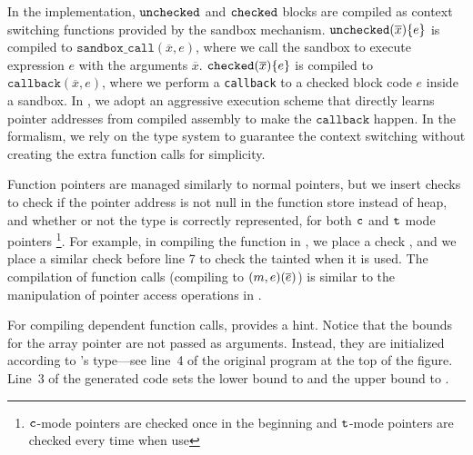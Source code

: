 %
In the \systemname implementation,
$\mathtt{unchecked}$ and $\mathtt{checked}$ blocks 
are compiled as context switching functions provided by the sandbox mechanism.
$\mathtt{unchecked}({\overline{x}})\{e\}$ is compiled to 
$\texttt{sandbox\_call}(\overline{x},e)$, where we call the sandbox 
to execute expression $e$ with the arguments $\overline{x}$.
$\mathtt{checked}({\overline{x}}){\{e\}}$ is compiled to 
$\texttt{callback}(\overline{x},e)$, where we perform 
a \texttt{callback} to a checked block code $e$ inside a sandbox.
In \systemname, we adopt an aggressive execution scheme that
directly learns pointer addresses from compiled assembly to make the $\texttt{callback}$ happen.
In the formalism, we rely on the type system to 
guarantee the context switching without creating the extra function calls for simplicity.


%
Function pointers are managed similarly to normal pointers,
but we insert checks to check if the pointer address is not null in 
the function store instead of heap, and whether or not the type is correctly represented, 
for both $\texttt{c}$ and $\texttt{t}$ mode pointers 
\footnote{$\texttt{c}$-mode pointers are checked once in the beginning and $\texttt{t}$-mode pointers are checked every time when use}.
For example, in compiling the  function in ,
we place a check ,
and we place a similar check before  line 7 to check the tainted  when it is used. 
The compilation of function calls (compiling to ${(m,e)}({\overline{e}})$) 
is similar to the manipulation of pointer access operations in .

For compiling dependent function calls,
 provides a hint.
Notice that the bounds for the array pointer  are not passed as
arguments. Instead, they are initialized according to 's
type---see line~4 of the original \lang program at the top of the figure.
Line~$3$ of the generated code
sets the lower bound  to  and the
upper bound to .

